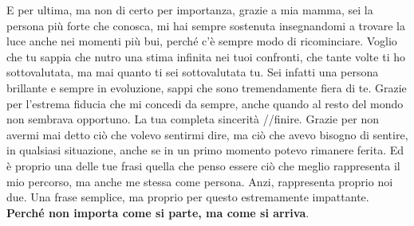 \begin{itshape}
\noindent E per ultima, ma non di certo per importanza, grazie a mia mamma, sei la persona più forte che conosca, mi hai sempre sostenuta insegnandomi a trovare la luce anche nei momenti più bui, perché c'è sempre modo di ricominciare. Voglio che tu sappia che nutro una stima infinita nei tuoi confronti, che tante volte ti ho sottovalutata, ma mai quanto ti sei sottovalutata tu. Sei infatti una persona brillante e sempre in evoluzione, sappi che sono tremendamente fiera di te. Grazie per l'estrema fiducia che mi concedi da sempre, anche quando al resto del mondo non sembrava opportuno. La tua completa sincerità //finire. Grazie per non avermi mai detto ciò che volevo sentirmi dire, ma ciò che avevo bisogno di sentire, in qualsiasi situazione, anche se in un primo momento potevo rimanere ferita. Ed è proprio una delle tue frasi quella che penso essere ciò che meglio rappresenta il mio percorso, ma anche me stessa come persona. Anzi, rappresenta proprio noi due. Una frase semplice, ma proprio per questo estremamente impattante. \\

\noindent \textbf{Perché non importa come si parte, ma come si arriva}.
\end{itshape}








